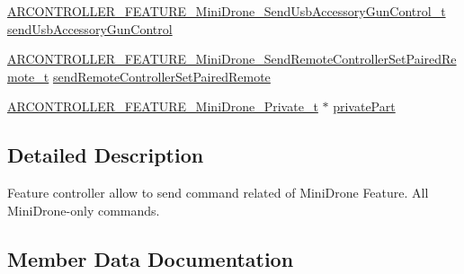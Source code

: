 \begin{DoxyCompactItemize}
\item 
\hyperlink{_a_r_c_o_n_t_r_o_l_l_e_r___feature_8h_afa40205356a2f1156010fb31aad4b211}{A\+R\+C\+O\+N\+T\+R\+O\+L\+L\+E\+R\+\_\+\+F\+E\+A\+T\+U\+R\+E\+\_\+\+Mini\+Drone\+\_\+\+Send\+Usb\+Accessory\+Gun\+Control\+\_\+t} \hyperlink{struct_a_r_c_o_n_t_r_o_l_l_e_r___f_e_a_t_u_r_e___mini_drone__t_a0a70d56d2e3f754079f7c45486afb925}{send\+Usb\+Accessory\+Gun\+Control}
\item 
\hyperlink{_a_r_c_o_n_t_r_o_l_l_e_r___feature_8h_a1203de3e7cb0e560800617c5b5d0fe93}{A\+R\+C\+O\+N\+T\+R\+O\+L\+L\+E\+R\+\_\+\+F\+E\+A\+T\+U\+R\+E\+\_\+\+Mini\+Drone\+\_\+\+Send\+Remote\+Controller\+Set\+Paired\+Remote\+\_\+t} \hyperlink{struct_a_r_c_o_n_t_r_o_l_l_e_r___f_e_a_t_u_r_e___mini_drone__t_a38f3af4c30a36ebe142f0d0ec62974d9}{send\+Remote\+Controller\+Set\+Paired\+Remote}
\item 
\hyperlink{_a_r_c_o_n_t_r_o_l_l_e_r___feature_8h_ac70e67fa380c5a872883eb02fbd1ba13}{A\+R\+C\+O\+N\+T\+R\+O\+L\+L\+E\+R\+\_\+\+F\+E\+A\+T\+U\+R\+E\+\_\+\+Mini\+Drone\+\_\+\+Private\+\_\+t} $\ast$ \hyperlink{struct_a_r_c_o_n_t_r_o_l_l_e_r___f_e_a_t_u_r_e___mini_drone__t_aa0c55631bfc19ab9977e418e421381d1}{private\+Part}
\end{DoxyCompactItemize}


\subsection{Detailed Description}
Feature controller allow to send command related of Mini\+Drone Feature. All Mini\+Drone-\/only commands. 

\subsection{Member Data Documentation}
